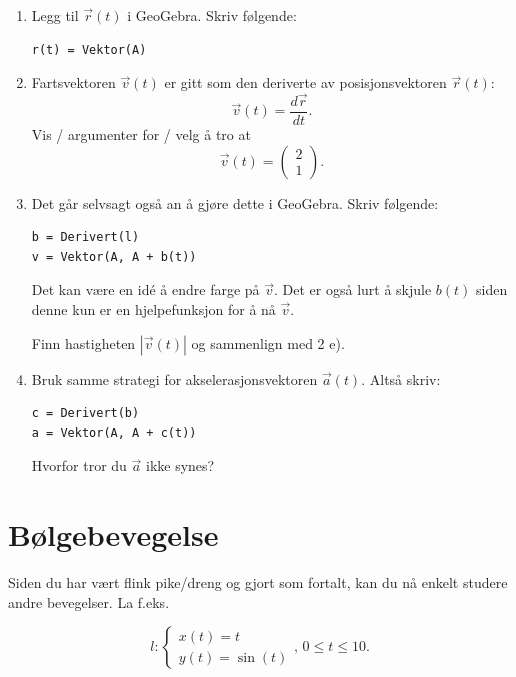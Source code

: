 \documentclass[a4paper,12pt]{article}
\begin{document}
\begin{enumerate}[label=\alph*)]
\item Legg til $\vec r (t)$ i GeoGebra. Skriv følgende:
\begin{lstlisting}
r(t) = Vektor(A)
\end{lstlisting}

\item Fartsvektoren $\vec v(t)$ er gitt som den deriverte av posisjonsvektoren $\vec r(t)$:
\[ \vec v(t) = \frac{d\vec r}{dt}. 
\]
Vis / argumenter for / velg å tro at \[ \vec v(t) = \begin{pmatrix}
2 \\
1
\end{pmatrix}.\]

\item Det går selvsagt også an å gjøre dette i GeoGebra. Skriv følgende:
\begin{lstlisting}
b = Derivert(l)
v = Vektor(A, A + b(t))
\end{lstlisting}
Det kan være en idé å endre farge på $\vec v$. Det er også lurt å skjule $b(t)$ siden denne kun er en hjelpefunksjon for å nå $\vec v$.\newline

Finn hastigheten $|\vec v(t)|$ og sammenlign med 2 e).

\item Bruk samme strategi for akselerasjonsvektoren $\vec a(t)$. Altså skriv:
\begin{lstlisting}
c = Derivert(b)
a = Vektor(A, A + c(t))
\end{lstlisting}

Hvorfor tror du $\vec a$ ikke synes?



\end{enumerate}


\section*{Bølgebevegelse}

Siden du har vært flink pike/dreng og gjort som fortalt, kan du nå enkelt studere andre bevegelser. La f.eks.

\[
l:
\begin{cases}
x(t)=t \\
y(t)=\sin(t)
\end{cases},\, 0\leq t \leq 10.
\]
\end{document}
